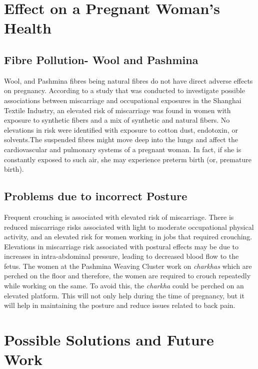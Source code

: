 \documentclass[journal]{IEEEtran}
\begin{document}
\section{Effect on a Pregnant Woman's Health}
\subsection{Fibre Pollution- Wool and Pashmina} 
Wool, and Pashmina fibres being natural fibres do not have direct adverse effects on pregnancy. According to a study that was conducted to investigate possible associations between miscarriage and occupational exposures in the Shanghai Textile Industry, an elevated risk of miscarriage was found in women with exposure to synthetic fibers and a mix of synthetic and natural fibers. No elevations in risk were identified with exposure to cotton dust, endotoxin, or solvents.The suspended fibres might move deep into the lungs and affect the cardiovascular and pulmonary systems of a pregnant woman. In fact, if she is constantly exposed to such air, she may experience preterm birth (or, premature birth).

\subsection{Problems due to incorrect Posture}
Frequent crouching is associated with elevated risk of miscarriage.
There is reduced miscarriage risks associated with light to moderate occupational physical activity, and an elevated risk for women working in jobs that required crouching. Elevations in miscarriage risk associated with postural effects may be due to increases in intra-abdominal pressure, leading to decreased blood flow to the fetus. The women at the Pashmina Weaving Cluster work on \textit{charkhas} which are perched on the floor and therefore, the women are required to crouch repeatedly while working on the same. To avoid this, the \textit{charkha} could be perched on an elevated platform. This will not only help during the time of pregnancy, but it will help in maintaining the posture and reduce issues related to back pain.


\section{Possible Solutions and Future Work}
\end{document}
